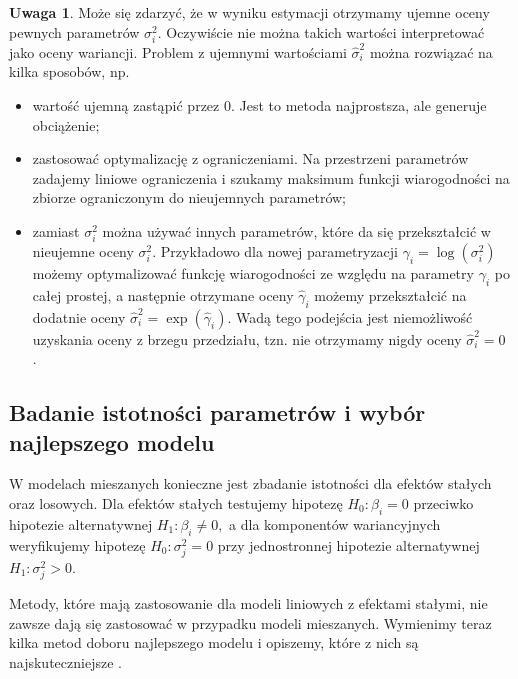 \documentclass[12pt]{mwbk}
\theoremstyle{plain}
\theoremstyle{definition}
\theoremstyle{definition}
\newtheorem{uwaga}{Uwaga}[chapter]
\begin{document}
\begin{uwaga}
	Może się zdarzyć, że w wyniku estymacji otrzymamy ujemne oceny pewnych parametrów $\sigma_i^2$. Oczywiście nie można takich wartości interpretować jako oceny wariancji. Problem z ujemnymi wartościami $\hat{\sigma}^2_i$ można rozwiązać na kilka sposobów, np.
	\begin{itemize}
		\item wartość ujemną zastąpić przez 0. Jest to metoda najprostsza, ale generuje obciążenie;
		\item zastosować optymalizację z ograniczeniami. Na przestrzeni parametrów zadajemy liniowe ograniczenia i szukamy maksimum funkcji wiarogodności na zbiorze ograniczonym do nieujemnych parametrów;
		\item zamiast $\sigma_i^2$ można używać innych parametrów, które da się przekształcić w nieujemne oceny $\sigma^2_i$. Przykładowo dla nowej parametryzacji $\gamma_i=\log(\sigma^2_i)$ możemy optymalizować funkcję wiarogodności ze względu na parametry $\gamma_i$ po całej prostej, a następnie otrzymane oceny $\hat{\gamma}_i$ możemy przekształcić na dodatnie oceny $\hat{\sigma}_i^2=\exp(\hat{\gamma}_i)$. Wadą tego podejścia jest niemożliwość uzyskania oceny z brzegu przedziału, tzn. nie otrzymamy nigdy oceny $\hat{\sigma}^2_i=0$ \cite{biecek}.
	\end{itemize}
\end{uwaga}


\subsection{Badanie istotności parametrów i wybór najlepszego modelu}

W modelach mieszanych konieczne jest zbadanie istotności dla efektów stałych oraz losowych. Dla efektów stałych testujemy hipotezę $H_0: \beta_i=0$ przeciwko hipotezie alternatywnej $H_1: \beta_i \neq 0,$ a dla komponentów wariancyjnych weryfikujemy hipotezę $H_0: \sigma^2_j=0$ przy jednostronnej hipotezie alternatywnej  $H_1: \sigma^2_j>0.$ 



Metody, które mają zastosowanie dla modeli liniowych z efektami stałymi, nie zawsze dają się zastosować w przypadku modeli mieszanych. Wymienimy teraz kilka metod doboru najlepszego modelu i opiszemy, które z nich są najskuteczniejsze \cite{faraway}.
\end{document}
